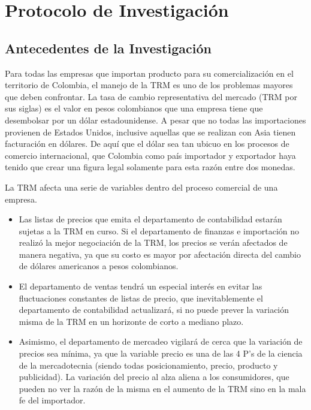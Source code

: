 \chapter{Protocolo de Investigación}

\section{Antecedentes de la Investigación}
Para todas las empresas que importan producto para su comercialización en el territorio de Colombia, el manejo de la TRM es uno de los problemas mayores que deben confrontar. La tasa de cambio representativa del mercado (TRM por sus siglas) es el valor en pesos colombianos que una empresa tiene que desembolsar por un dólar estadounidense. A pesar que no todas las importaciones provienen de Estados Unidos, inclusive aquellas que se realizan con Asia tienen facturación en dólares. De aquí que el dólar sea tan ubicuo en los procesos de comercio internacional, que Colombia como país importador y exportador haya tenido que crear una figura legal solamente para esta razón entre dos monedas. 

La TRM afecta una serie de variables dentro del proceso comercial de una empresa. 

\begin{itemize}
	\item Las listas de precios que emita el departamento de contabilidad estarán sujetas a la TRM en curso. Si el departamento de finanzas e importación no realizó la mejor negociación de la TRM, los precios se verán afectados de manera negativa, ya que su costo es mayor por afectación directa del cambio de dólares americanos a pesos colombianos.
	\item El departamento de ventas tendrá un especial interés en evitar las fluctuaciones constantes de listas de precio, que inevitablemente el departamento de contabilidad actualizará, si no puede prever la variación misma de la TRM en un horizonte de corto a mediano plazo. 
	\item Asimismo, el departamento de mercadeo vigilará de cerca que la variación de precios sea mínima, ya que la variable precio es una de las 4 P’s de la ciencia de la mercadotecnia (siendo todas posicionamiento, precio, producto y publicidad). La variación del precio al alza aliena a los consumidores, que pueden no ver la razón de la misma en el aumento de la TRM sino en la mala fe del importador. 	
\end{itemize}

